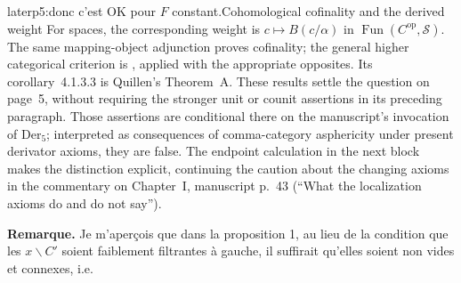 \begin{dcomment}{later}{p5:donc c'est OK pour $F$ constant.}{Cohomological cofinality and the derived weight}
For spaces, the corresponding weight is $c\mapsto B(c/\alpha)$ in $\operatorname{Fun}(C^{\mathrm{op}},\mathcal S)$. The same mapping-object adjunction proves cofinality; the general higher categorical criterion is \citet[Theorem~4.1.3.1, together with Proposition~4.1.1.8]{Lurie2009HTT}, applied with the appropriate opposites. Its corollary~4.1.3.3 is Quillen's Theorem~A. These results settle the question on page~5, without requiring the stronger unit or counit assertions in its preceding paragraph. Those assertions are conditional there on the manuscript's invocation of $\mathrm{Der}_5$; interpreted as consequences of comma-category asphericity under present derivator axioms, they are false. The endpoint calculation in the next block makes the distinction explicit, continuing the caution about the changing axioms in the commentary on Chapter~I, manuscript p.~43 (``What the localization axioms do and do not say'').
\end{dcomment}


\textbf{Remarque.} Je m'aperçois que dans la proposition 1, au lieu de la condition que les $x\backslash C'$ soient faiblement filtrantes à gauche, il suffirait qu'elles soient non vides et connexes, i.e.

